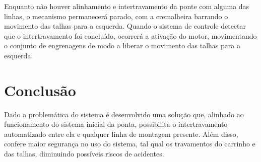 \documentclass[a4paper, 12pt]{article}
\begin{document}
Enquanto não houver alinhamento e intertravamento da ponte com alguma das linhas, o mecanismo permanecerá parado, com a cremalheira barrando o movimento das talhas para a esquerda. Quando o sistema de controle detectar que o intertravamento foi concluído, ocorrerá a ativação do motor, movimentando o conjunto de engrenagens de modo a liberar o movimento das talhas para a esquerda. 

\newpage
\section{Conclusão}

Dado a problemática do sistema é desenvolvido uma solução que, alinhado ao funcionamento do sistema inicial da ponta, possibilita o intertravamento automatizado entre ela e qualquer linha de montagem presente. Além disso, confere maior segurança no uso do sistema, tal qual os travamentos do carrinho e das talhas, diminuindo possíveis riscos de acidentes.



    \nocite{*}
    
    
\end{document}
